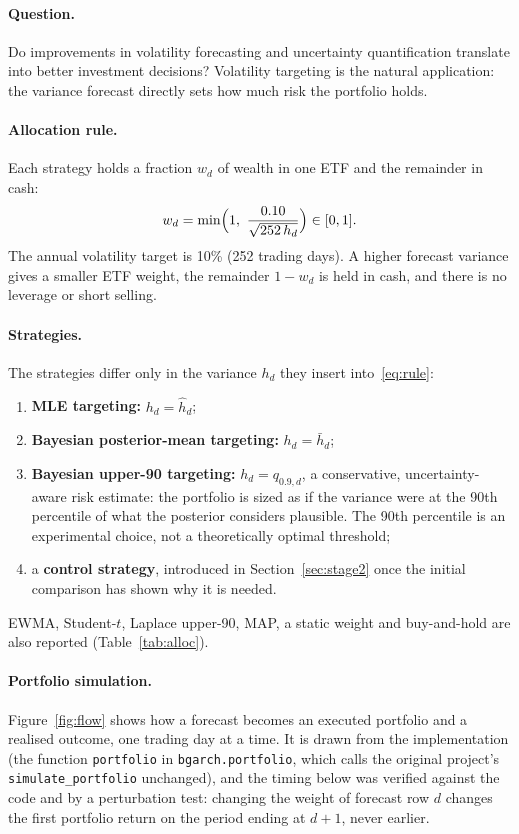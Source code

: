 \documentclass[11pt]{article}
\begin{document}
\paragraph{Question.} Do improvements in volatility forecasting and uncertainty quantification translate into better
investment decisions? Volatility targeting \cite{moreira2017} is the natural application: the variance forecast
directly sets how much risk the portfolio holds.

\paragraph{Allocation rule.} Each strategy holds a fraction $w_d$ of wealth in one ETF and the remainder in cash:
\begin{equation}\label{eq:rule}
w_d=\min\Bigl(1,\ \frac{0.10}{\sqrt{252\,h_d}}\Bigr)\in[0,1].
\end{equation}
The annual volatility target is 10\% (252 trading days). A higher forecast variance gives a smaller ETF weight, the
remainder $1-w_d$ is held in cash, and there is no leverage or short selling.

\paragraph{Strategies.} The strategies differ only in the variance $h_d$ they insert into~\eqref{eq:rule}:
\begin{enumerate}
\item \textbf{MLE targeting:} $h_d=\hat h_d$;
\item \textbf{Bayesian posterior-mean targeting:} $h_d=\bar h_d$;
\item \textbf{Bayesian upper-90 targeting:} $h_d=q_{0.9,d}$, a conservative, uncertainty-aware risk estimate: the
portfolio is sized as if the variance were at the 90th percentile of what the posterior considers plausible. The 90th
percentile is an experimental choice, not a theoretically optimal threshold;
\item a \textbf{control strategy}, introduced in Section~\ref{sec:stage2} once the initial comparison has shown why it is needed.
\end{enumerate}
EWMA, Student-$t$, Laplace upper-90, MAP, a static weight and buy-and-hold are also reported (Table~\ref{tab:alloc}).

\paragraph{Portfolio simulation.} Figure~\ref{fig:flow} shows how a forecast becomes an executed portfolio and a
realised outcome, one trading day at a time. It is drawn from the implementation (the function \texttt{portfolio} in
\texttt{bgarch.portfolio}, which calls the original project's \texttt{simulate\_portfolio} unchanged), and the timing below was verified against
the code and by a perturbation test: changing the weight of forecast row $d$ changes the first portfolio return on
the period ending at $d+1$, never earlier.
\end{document}
